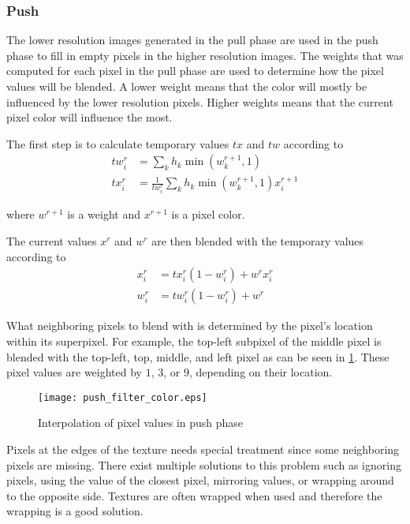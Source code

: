 \begin{subs}
\subsubsection{Push}
The lower resolution images generated in the pull phase are used in the push phase to fill in empty pixels in the higher resolution images. The weights that was computed for each pixel in the pull phase are used to determine how the pixel values will be blended. A lower weight means that the color will mostly be influenced by the lower resolution pixels. Higher weights means that the current pixel color will influence the most.

The first step is to calculate temporary values $tx$ and $tw$ according to
\begin{align}
  tw^{r}_i &= \sum_k {h_k \min(w^{r+1}_k,1)} \label{eq:push_tw}\\
  tx^{r}_i &= \frac{1}{tw^{r}_i} \sum_k {h_k \min(w^{r+1}_k,1) x^{r+1}_i} \label{eq:push_tx}
\end{align}

where \(w^{r+1}\) is a weight and \(x^{r+1}\) is a pixel color.

The current values $x^r$ and $w^r$ are then blended with the temporary values according to
\begin{align}
  x^r_i &= tx^r_i (1 - w^r_i) + w^r x^r_i \label{eq:push_x}\\
  w^r_i &= tw^r_i (1 - w^r_i) + w^r \label{eq:push_w}
\end{align}

What neighboring pixels to blend with is determined by the pixel's location within its superpixel. For example, the top-left subpixel of the middle pixel is blended with the top-left, top, middle, and left pixel as can be seen in \cref{fig:push_filter}. These pixel values are weighted by $1$, $3$, or $9$,  depending on their location.

\begin{figure}[h]
    \centering
    \texttt{[image: push\_filter\_color.eps]}
    \caption{Interpolation of pixel values in push phase}
    \label{fig:push_filter}
\end{figure}

\end{subs}

 Pixels at the edges of the texture needs special treatment since some neighboring pixels are missing. There exist multiple solutions to this problem such as ignoring pixels, using the value of the closest pixel, mirroring values, or wrapping around to the opposite side. Textures are often wrapped when used and therefore the wrapping is a good solution.

